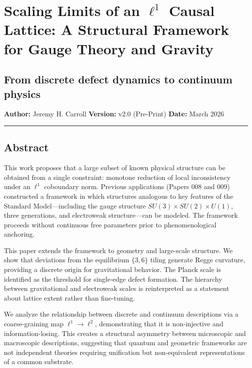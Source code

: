 \documentclass[
]{article}
\author{}
\date{}
\begin{document}
\section{\texorpdfstring{Scaling Limits of an \(\ell^1\) Causal Lattice:
A Structural Framework for Gauge Theory and
Gravity}{Scaling Limits of an \textbackslash ell\^{}1 Causal Lattice: A Structural Framework for Gauge Theory and Gravity}}\label{scaling-limits-of-an-ell1-causal-lattice-a-structural-framework-for-gauge-theory-and-gravity}

\subsection{From discrete defect dynamics to continuum
physics}\label{from-discrete-defect-dynamics-to-continuum-physics}

\textbf{Author:} Jeremy H. Carroll \textbf{Version:} v2.0 (Pre-Print)
\textbf{Date:} March 2026

\begin{center}\rule{0.5\linewidth}{0.5pt}\end{center}

\subsection{Abstract}\label{abstract}

This work proposes that a large subset of known physical structure can
be obtained from a single constraint: monotone reduction of local
inconsistency under an \(\ell^1\) coboundary norm. Previous applications
(Papers 008 and 009) constructed a framework in which structures
analogous to key features of the Standard Model---including the gauge
structure \(SU(3) \times SU(2) \times U(1)\), three generations, and
electroweak structure---can be modeled. The framework proceeds without
continuous free parameters prior to phenomenological anchoring.

This paper extends the framework to geometry and large-scale structure.
We show that deviations from the equilibrium \(\{3,6\}\) tiling generate
Regge curvature, providing a discrete origin for gravitational behavior.
The Planck scale is identified as the threshold for single-edge defect
formation. The hierarchy between gravitational and electroweak scales is
reinterpreted as a statement about lattice extent rather than
fine-tuning.

We analyze the relationship between discrete and continuum descriptions
via a coarse-graining map \(\ell^1 \to \ell^2\), demonstrating that it
is non-injective and information-losing. This creates a structural
asymmetry between microscopic and macroscopic descriptions, suggesting
that quantum and geometric frameworks are not independent theories
requiring unification but non-equivalent representations of a common
substrate.
\end{document}
